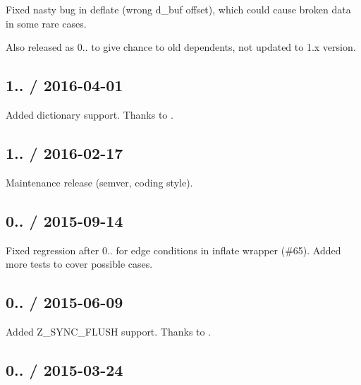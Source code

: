 
\begin{DoxyItemize}
\item Fixed nasty bug in deflate (wrong {\ttfamily d\+\_\+buf} offset), which could cause broken data in some rare cases.
\item Also released as 0.. to give chance to old dependents, not updated to 1.\+x version.
\end{DoxyItemize}

\subsection*{1.. / 2016-\/04-\/01 }


\begin{DoxyItemize}
\item Added dictionary support. Thanks to .
\end{DoxyItemize}

\subsection*{1.. / 2016-\/02-\/17 }


\begin{DoxyItemize}
\item Maintenance release (semver, coding style).
\end{DoxyItemize}

\subsection*{0.. / 2015-\/09-\/14 }


\begin{DoxyItemize}
\item Fixed regression after 0.. for edge conditions in inflate wrapper (\#65). Added more tests to cover possible cases.
\end{DoxyItemize}

\subsection*{0.. / 2015-\/06-\/09 }


\begin{DoxyItemize}
\item Added Z\+\_\+\+S\+Y\+N\+C\+\_\+\+F\+L\+U\+SH support. Thanks to .
\end{DoxyItemize}

\subsection*{0.. / 2015-\/03-\/24 }


